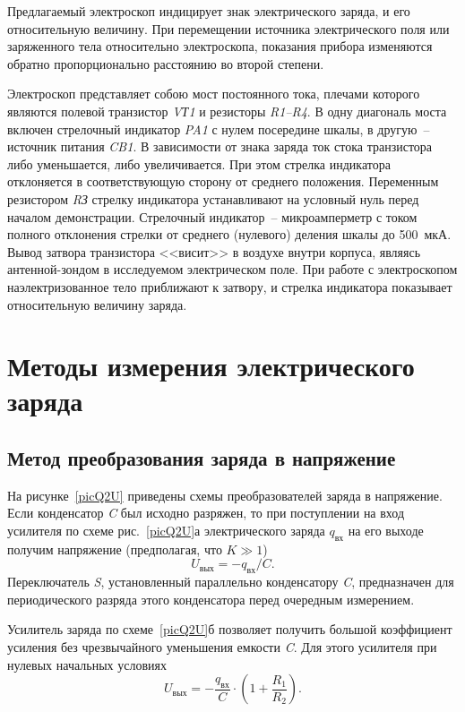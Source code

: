 \documentclass[pscyr]{hedwork}
\begin{document}
  Предлагаемый электроскоп индицирует знак электрического заряда, и его
  относительную величину. При перемещении источника электрического поля или
  заряженного тела относительно электроскопа, показания прибора изменяются
  обратно пропорционально расстоянию во второй степени.

  Электроскоп представляет собою мост постоянного тока, плечами которого
  являются полевой транзистор \emph{VТ1} и резисторы \emph{R1--R4}. В одну
  диагональ моста включен стрелочный индикатор \emph{PA1} с нулем посередине
  шкалы, в другую~-- источник питания \emph{CB1}. В зависимости от знака заряда
  ток стока транзистора либо уменьшается, либо увеличивается. При этом стрелка
  индикатора отклоняется в соответствующую сторону от среднего положения.
  Переменным резистором \emph{RЗ} стрелку индикатора устанавливают на условный
  нуль перед началом демонстрации. Стрелочный индикатор~-- микроамперметр с
  током полного отклонения стрелки от среднего (нулевого) деления шкалы до
  500~мкА. Вывод затвора транзистора <<висит>> в воздухе внутри корпуса, являясь
  антенной-зондом в исследуемом электрическом поле. При работе с электроскопом
  наэлектризованное тело приближают к затвору, и стрелка индикатора показывает
  относительную величину заряда.

  \section{Методы измерения электрического заряда}
  \subsection{Метод преобразования заряда в напряжение}

  На рисунке~\ref{picQ2U} приведены схемы преобразователей заряда в напряжение.
  Если конденсатор \emph{C} был исходно разряжен, то при поступлении на вход
  усилителя по схеме рис.~\ref{picQ2U}а электрического заряда \( q_\text{вх} \)
  на его выходе получим напряжение (предполагая, что \( K \gg 1 \))
  \[
    U_\text{вых} = -q_\text{вх} / C.
  \]
  Переключатель \emph{S}, установленный
  параллельно конденсатору \emph{C}, предназначен для периодического разряда
  этого конденсатора перед очередным измерением.
  
  Усилитель заряда по схеме~\ref{picQ2U}б позволяет получить большой коэффициент
  усиления без чрезвычайного уменьшения емкости \emph{C}. Для этого усилителя
  при нулевых начальных условиях
  \[
    U_\text{вых} = -\frac{q_\text{вх}}{C}\cdot
      \left( 1 + \frac{R_1}{R_2} \right).
  \]
\end{document}
